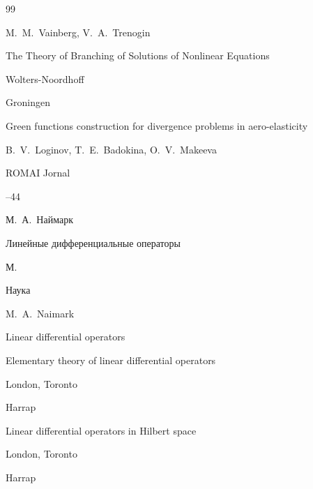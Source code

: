 \begin{thebibliography}{99}
\transl

\by M.~M.~Vainberg, V.~A.~Trenogin 

\book The Theory of Branching of Solutions of Nonlinear Equations

\publ Wolters-Noordhoff

\publaddr Groningen




\newpage






\paper Green functions construction for divergence problems in aero-elasticity

\by  B.~V.~Loginov, T.~E.~Badokina, O.~V.~Makeeva

\jour ROMAI Jornal




--44




\by М.~А.~Наймарк

\book Линейные дифференциальные операторы

\publaddr М.

\publ Наука



\transl

\by M.~A.~Naimark 

\book Linear differential operators


\volinfo Elementary theory of linear differential operators 

\publaddr London, Toronto 

\publ Harrap


\moreref


\volinfo Linear differential operators in Hilbert space

\publaddr London, Toronto 

\publ Harrap








\end{thebibliography}
